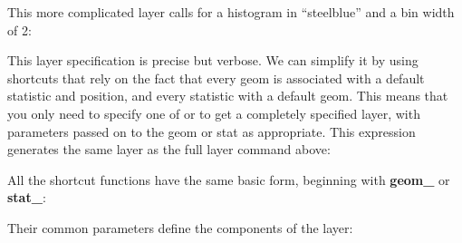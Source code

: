 % 


\noindent This more complicated layer calls for a histogram in ``steelblue'' and a bin width of 2:

% 


\noindent  This layer specification is precise but verbose. We can simplify it by using shortcuts that rely on the fact that every geom is associated with a default statistic and position, and every statistic with a default geom.  This means that you only need to specify one of  or  to get a completely specified layer, with parameters passed on to the geom or stat as appropriate.  This expression generates the same layer as the full layer command above:

% 


\noindent All the shortcut functions have the same basic form, beginning with {\bf geom\_} or {\bf stat\_}:

% 

\noindent Their common parameters define the components of the layer:

